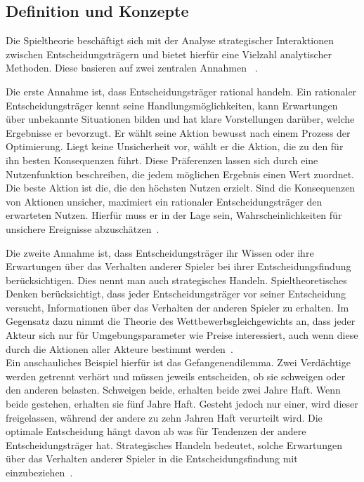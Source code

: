 \subsection{Definition und Konzepte}
Die Spieltheorie beschäftigt sich mit der Analyse strategischer Interaktionen zwischen Entscheidungsträgern und bietet hierfür eine Vielzahl analytischer Methoden.
Diese basieren auf zwei zentralen Annahmen ~\cite[Kap.~1.1]{osborne1994course}.


Die erste Annahme ist, dass Entscheidungsträger rational handeln.
Ein rationaler Entscheidungsträger kennt seine Handlungsmöglichkeiten, kann Erwartungen über unbekannte Situationen bilden und hat klare Vorstellungen darüber, welche Ergebnisse er bevorzugt.
Er wählt seine Aktion bewusst nach einem Prozess der Optimierung.
Liegt keine Unsicherheit vor, wählt er die Aktion, die zu den für ihn besten Konsequenzen führt.
Diese Präferenzen lassen sich durch eine Nutzenfunktion beschreiben, die jedem möglichen Ergebnis einen Wert zuordnet.
Die beste Aktion ist die, die den höchsten Nutzen erzielt.
Sind die Konsequenzen von Aktionen unsicher, maximiert ein rationaler Entscheidungsträger den erwarteten Nutzen.
Hierfür muss er in der Lage sein, Wahrscheinlichkeiten für unsichere Ereignisse abzuschätzen~\cite[Kap.~1.4]{osborne1994course}.

Die zweite Annahme ist, dass Entscheidungsträger ihr Wissen oder ihre Erwartungen über das Verhalten anderer Spieler bei ihrer Entscheidungsfindung berücksichtigen. 
Dies nennt man auch strategisches Handeln.
Spieltheoretisches Denken berücksichtigt, dass jeder Entscheidungsträger vor seiner Entscheidung versucht, Informationen über das Verhalten der anderen Spieler zu erhalten.
Im Gegensatz dazu nimmt die Theorie des Wettbewerbsgleichgewichts an, dass jeder Akteur sich nur für Umgebungsparameter wie Preise interessiert, auch wenn diese durch die Aktionen aller Akteure bestimmt werden~\cite[Kap.~1.3]{osborne1994course}.\\
Ein anschauliches Beispiel hierfür ist das Gefangenendilemma. 
Zwei Verdächtige werden getrennt verhört und müssen jeweils entscheiden, ob sie schweigen oder den anderen belasten. 
Schweigen beide, erhalten beide zwei Jahre Haft.
Wenn beide gestehen, erhalten sie fünf Jahre Haft.
Gesteht jedoch nur einer, wird dieser freigelassen, während der andere zu zehn Jahren Haft verurteilt wird.
Die optimale Entscheidung hängt davon ab was für Tendenzen der andere Entscheidungsträger hat.
Strategisches Handeln bedeutet, solche Erwartungen über das Verhalten anderer Spieler in die Entscheidungsfindung mit einzubeziehen~\cite[Kap.~1.1]{osborne1994course}.

